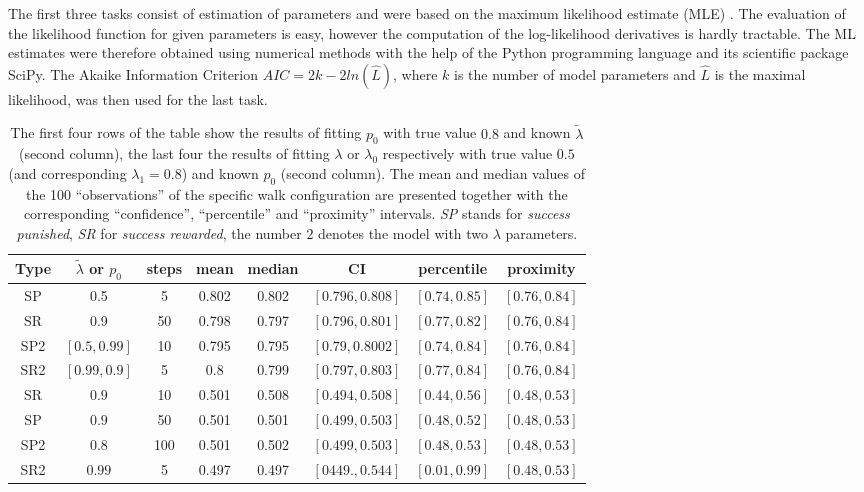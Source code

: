 \documentclass{amsart}
\theoremstyle{definition}
\theoremstyle{plain}
\theoremstyle{plain}
\theoremstyle{plain}
\numberwithin{equation}{section}
\begin{document}
The first three tasks consist of estimation of parameters and were based on the maximum likelihood estimate (MLE) \cite{rossi2018mathematical}. The evaluation of the likelihood function for given parameters is easy, however the computation of the log-likelihood derivatives is hardly tractable. The ML estimates were therefore obtained using numerical methods with the help of the Python programming language and its scientific package SciPy. The Akaike Information Criterion $AIC=2k-2ln(\hat{L})$, where $k$ is the number of model parameters and $\hat{L}$ is the maximal likelihood, was then used for the last task.

\begin{table}
\begin{centering}
{\caption{\label{tab:Fitting-results} The first four rows of the table show the results of fitting $p_0$ with true value $0.8$ and known $\tilde{\lambda}$ (second column), the last four the results of fitting $\lambda$ or $\lambda_0$ respectively with true value $0.5$ (and corresponding $\lambda_1=0.8$) and known $p_0$ (second column). The mean and median values of the 100 ``observations''  of the specific walk configuration are presented together with the corresponding ``confidence'', ``percentile'' and ``proximity'' intervals.  \emph{SP }stands for \emph{success punished}, \emph{SR} for \emph{success rewarded}, the number $2$ denotes the model with two $\lambda$ parameters.}}
\begin{tabular}{|c|c|c|c|c|c|c|c|}
\hline
 Type & $\tilde{\lambda}$ or $p_0$ & steps & mean & median & CI & percentile & proximity \tabularnewline
\hline
SP & 0.5 & 5 & 0.802 & 0.802 & $[0.796, 0.808]$ & $[0.74, 0.85]$ & $[0.76,0.84]$ \tabularnewline
\hline
SR & 0.9 & 50 & 0.798 & 0.797 & $[0.796,0.801 ]$ & $[0.77, 0.82]$ & $[0.76,0.84]$ \tabularnewline
\hline
SP2 & $[0.5,0.99]$ & 10 & 0.795 & 0.795 &$[0.79,0.8002]$  & $[0.74,0.84]$ & $[0.76,0.84]$ \tabularnewline
\hline
SR2 &  $[0.99,0.9]$ & 5 & 0.8 & 0.799 & $[0.797,0.803]$ & $[0.77,0.84]$ & $[0.76,0.84]$ \tabularnewline
\hline
SR & $0.9$ & 10 & 0.501 & 0.508 & $[0.494,0.508]$ & $[0.44,0.56]$ & $[0.48,0.53]$ \tabularnewline
\hline
SP & $0.9$ & 50 & 0.501 & 0.501 & $[0.499,0.503]$ & $[0.48,0.52]$ & $[0.48,0.53]$ \tabularnewline
\hline
SP2 & $0.8$ & 100 & 0.501 & 0.502 & $[0.499,0.503]$ & $[0.48,0.53]$ & $[0.48,0.53]$ \tabularnewline
\hline
SR2 & $0.99$ & 5 & 0.497 & 0.497 & $[0449.,0.544]$ & $[0.01,0.99]$ & $[0.48,0.53]$ \tabularnewline
\hline
\end{tabular}
\par\end{centering}
\end{table}
\end{document}

